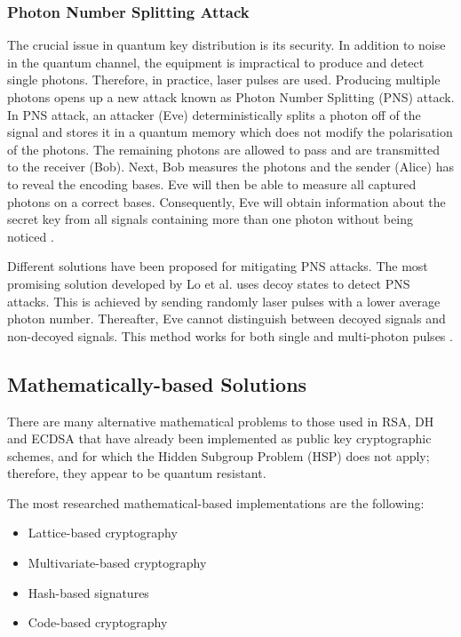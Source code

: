 \documentclass[conference, letterpaper]{IEEEtran}
\begin{document}
\subsubsection{Photon Number Splitting Attack}
The crucial issue in quantum key distribution is its security. In addition to noise in the quantum channel, the equipment is impractical to produce and detect single photons. Therefore, in practice, laser pulses are used. Producing multiple photons opens up a new attack known as Photon Number Splitting (PNS) attack. In PNS attack, an attacker (Eve) deterministically splits a photon off of the signal and stores it in a quantum memory which does not modify the polarisation of the photons. The remaining photons are allowed to pass and are transmitted to the receiver (Bob). Next, Bob measures the photons and the sender (Alice) has to reveal the encoding bases. Eve will then be able to measure all captured photons on a correct bases. Consequently, Eve will obtain information about the secret key from all signals containing more than one photon without being noticed \cite{brassard2000security}.

Different solutions have been proposed for mitigating PNS attacks. The most promising solution developed by Lo et al. \cite{lo2005decoy} uses decoy states to detect PNS attacks. This is achieved by sending  randomly laser pulses with a lower average photon number. Thereafter, Eve cannot distinguish between decoyed signals and non-decoyed signals. This method works for both single and multi-photon pulses \cite{haitjema2007survey}.  

\subsection{Mathematically-based Solutions}
There are many alternative mathematical problems to those used in RSA, DH and ECDSA that have already been implemented as public key cryptographic schemes, and for which the Hidden Subgroup Problem (HSP) \cite{Lomonaco2002} does not apply; therefore, they appear to be quantum resistant. 

The most researched mathematical-based implementations are the following:

\begin{itemize}
\item Lattice-based cryptography \cite{Micciancio2009} 
\item Multivariate-based cryptography \cite{Ding2009} 
\item Hash-based signatures \cite{Dods2005}
\item Code-based cryptography \cite{Overbeck2009} 
\end{itemize}
\end{document}
